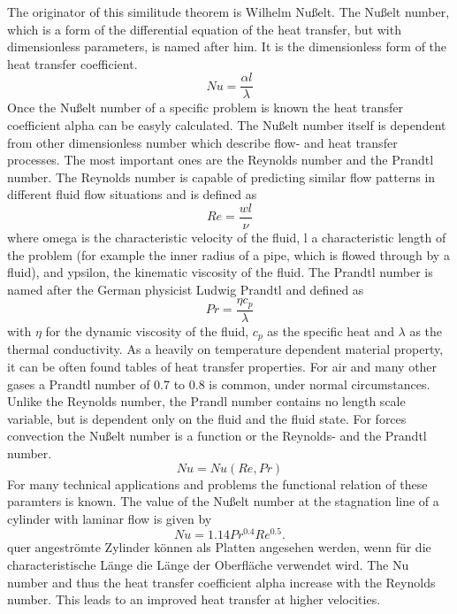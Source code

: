 The originator of this similitude theorem is Wilhelm Nußelt. The Nußelt number, which is a form of the differential equation of the heat transfer, but with dimensionless parameters, is named after him. It is the dimensionless form of the heat transfer coefficient.
\begin{equation}
Nu = \frac{\alpha l}{\lambda}
\end{equation}
Once the Nußelt number of a specific problem is known the heat transfer coefficient alpha can be easyly calculated. The Nußelt number itself is dependent from other dimensionless number which describe flow- and heat transfer processes.
The most important ones are the Reynolds number and the Prandtl number. The Reynolds number is capable of predicting similar flow patterns in different fluid flow situations and is defined as 
\begin{equation}
Re = \frac{w l}{\nu}
\end{equation}
where omega is the characteristic velocity of the fluid, l a characteristic length of the problem (for example the inner radius of a pipe, which is flowed through by a fluid), and ypsilon, the kinematic viscosity of the fluid.
The Prandtl number is named after the German physicist Ludwig Prandtl and defined as
\begin{equation}
Pr = \frac{\eta c_p}{\lambda}
\end{equation}
with $\eta$ for the dynamic viscosity of the fluid, $c_p$ as the specific heat and $\lambda$ as the thermal conductivity. As a heavily on temperature dependent material property, it can be often found tables of heat transfer properties. For air and many other gases a Prandtl number of 0.7 to 0.8 is common, under normal circumstances. Unlike the Reynolds number, the Prandl number contains no length scale variable, but is dependent only on the fluid and the fluid state.
For forces convection the Nußelt number is a function or the Reynolds- and the Prandtl number.
\begin{equation}
Nu = Nu( Re, Pr )
\end{equation}
For many technical applications and problems the functional relation of these paramters is known. The value of the Nußelt number at the stagnation line of a cylinder with laminar flow is given by
\begin{equation}
Nu = 1.14Pr^{0.4} Re^{0.5}. 
\end{equation}
quer angeströmte Zylinder können als Platten angesehen werden, wenn für die characteristische Länge die Länge der Oberfläche verwendet wird. The Nu number and thus the heat transfer coefficient alpha increase with the Reynolds number. This leads to an improved heat transfer at higher velocities. 
